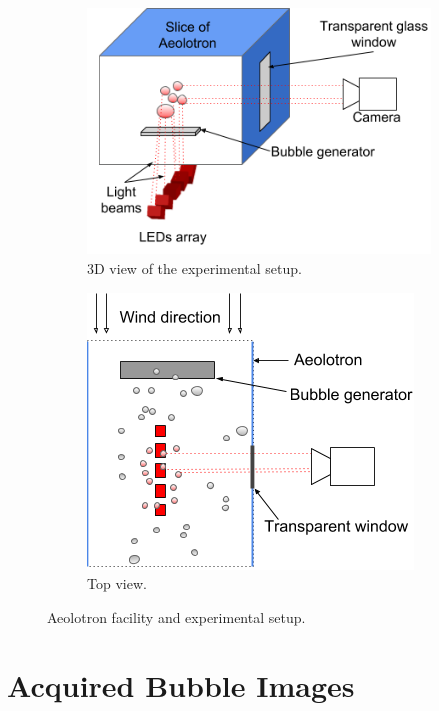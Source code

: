 \begin{figure}[h]
			\begin{subfigure}[t]{.4\linewidth}		
				\includegraphics[scale=.5]{images/aeolotron_setup.png}
				\caption{3D view of the experimental setup.}
			\end{subfigure}\hfill%
			\begin{subfigure}[t]{.4\linewidth}		
				\includegraphics[scale=.5]{images/aeolotron_setup_above.png}
				\caption{Top view.}
				\label{subfig:aeolotron_setup_above}
			\end{subfigure}
			
			\caption{Aeolotron facility and experimental setup.}
			\label{fig:aeolotron_setup}
		\end{figure}
	
		
		
	\section{Acquired Bubble Images}\label{measurement_results}
	
